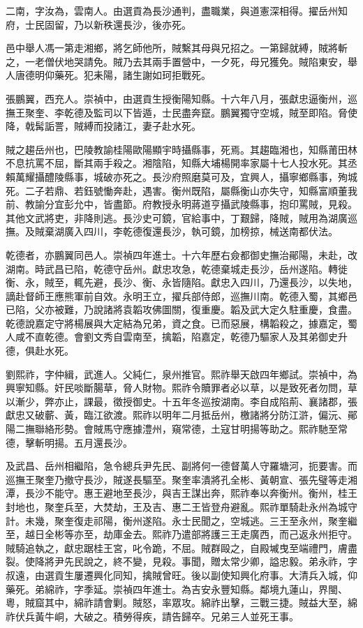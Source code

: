 \begin{pinyinscope}
二南，字汝為，雲南人。由選貢為長沙通判，盡職業，與道憲深相得。擢岳州知府，士民固留，乃以新秩還長沙，後亦死。

邑中舉人馮一第走湘鄉，將乞師他所，賊繫其母與兄招之。一第歸就縛，賊將斬之，一老僧伏地哭請免。賊乃去其兩手置營中，一夕死，母兄獲免。賊陷東安，舉人唐德明仰藥死。犯耒陽，諸生謝如珂拒戰死。

張鵬翼，西充人。崇禎中，由選貢生授衡陽知縣。十六年八月，張獻忠逼衡州，巡撫王聚奎、李乾德及監司以下皆遁，士民盡奔竄。鵬翼獨守空城，賊至即陷。脅使降，戟髯詬詈，賊縛而投諸江，妻子赴水死。

賊之趨岳州也，巴陵教諭桂陽歐陽顯宇時攝縣事，死焉。其趨臨湘也，知縣莆田林不息抗罵不屈，斷其兩手殺之。湘陰陷，知縣大埔楊開率家屬十七人投水死。其丞賴萬耀攝醴陵縣事，城破亦死之。長沙府照磨莫可及，宜興人，攝寧鄉縣事，殉城死。二子若鼎、若鈺號慟奔赴，遇害。衡州既陷，屬縣衡山亦失守，知縣富順董我前、教諭分宜彭允中，皆盡節。府教授永明蔣道亨攝武陵縣事，抱印罵賊，見殺。其他文武將吏，非降則逃。長沙史可鏡，官給事中，丁艱歸，降賊，賊用為湖廣巡撫。及賊棄湖廣入四川，李乾德復還長沙，執可鏡，加榜掠，械送南都伏法。

乾德者，亦鵬翼同邑人。崇禎四年進士。十六年歷右僉都御史撫治鄖陽，未赴，改湖南。時武昌已陷，乾德守岳州。獻忠攻急，乾德棄城走長沙，岳州遂陷。轉徙衡、永，賊至，輒先避，長沙、衡、永皆隨陷。獻忠入四川，乃還長沙，以失地，謫赴督師王應熊軍前自效。永明王立，擢兵部侍郎，巡撫川南。乾德入蜀，其鄉邑已陷，父亦被難，乃說諸將袁韜攻佛圖關，復重慶。韜及武大定久駐重慶，食盡。乾德說嘉定守將楊展與大定結為兄弟，資之食。已而惡展，構韜殺之，據嘉定，蜀人咸不直乾德。會劉文秀自雲南至，擒韜，陷嘉定，乾德乃驅家人及其弟御史升德，俱赴水死。

劉熙祚，字仲緝，武進人。父純仁，泉州推官。熙祚舉天啟四年鄉試。崇禎中，為興寧知縣。奸民啖斷腸草，脅人財物。熙祚令贖罪者必以草，以是致死者勿問，草以漸少，弊亦止，課最，徵授御史。十五年冬巡按湖南。李自成陷荊、襄諸郡，張獻忠又破蘄、黃，臨江欲渡。熙祚以明年二月抵岳州，檄諸將分防江滸，偏沅、鄖陽二撫聯絡形勢。會賊馬守應據澧州，窺常德，土寇甘明揚等助之。熙祚馳至常德，擊斬明揚。五月還長沙。

及武昌、岳州相繼陷，急令總兵尹先民、副將何一德督萬人守羅塘河，扼要害。而巡撫王聚奎乃撤守長沙，賊遂長驅至。聚奎率潰將孔全彬、黃朝宣、張先璧等走湘潭，長沙不能守。惠王避地至長沙，與吉王謀出奔，熙祚奉以奔衡州。衡州，桂王封地也，聚奎兵至，大焚劫，王及吉、惠二王皆登舟避亂。熙祚單騎赴永州為城守計。未幾，聚奎復走祁陽，衡州遂陷。永士民聞之，空城逃。三王至永州，聚奎繼至，越日全彬等亦至，劫庫金去。熙祚乃遣部將護三王走廣西，而己返永州拒守。賊騎追執之，獻忠踞桂王宮，叱令跪，不屈。賊群毆之，自殿墄曳至端禮門，膚盡裂。使降將尹先民說之，終不變，見殺。事聞，贈太常少卿，謚忠毅。弟永祚，字叔遠，由選貢生屢遷興化同知，擒賊曾旺。後以副使知興化府事。大清兵入城，仰藥死。弟綿祚，字季延。崇禎四年進士。為吉安永豐知縣。鄰境九蓮山，界閩、粵，賊窟其中，綿祚請會剿。賊怒，率眾攻。綿祚出擊，三戰三捷。賊益大至，綿祚伏兵黃牛峒，大破之。積勞得疾，請告歸卒。兄弟三人並死王事。


\end{pinyinscope}
